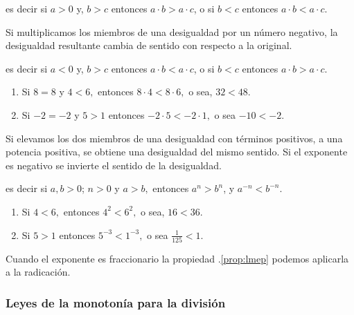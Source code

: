 \documentclass[oneside,english,spanish,2m,twoside,svgnames,x11names,HTML,twoside,12pt]{libro-matua}\usepackage[]{graphicx}\usepackage[]{color}
\def\myref#1{\textcolor{ptctitle}{\thesection .\ref{#1}}}
\begin{document}
es decir si $a>0$ y, $b>c$ entonces $a\cdot b>a\cdot c$, o si $b<c$
entonces $a\cdot b<a\cdot c$.

\begin{propiedad}{}

Si multiplicamos los miembros de una desigualdad por un número negativo,
la desigualdad resultante cambia de sentido con respecto a la original.

\end{propiedad}

es decir si $a<0$ y, $b>c$ entonces $a\cdot b<a\cdot c$, o si $b<c$
entonces $a\cdot b>a\cdot c$.\begin{ejemplos}
\begin{enumerate}
\item Si $8=8$ y $4<6,$ entonces $8\cdot4<8\cdot6,$ o sea, $32<48.$
\item Si $-2=-2$ y $5>1$ entonces $-2\cdot5<-2\cdot1,$ o sea $-10<-2$.
\end{enumerate}
\end{ejemplos}

\begin{propiedad}{\label{prop:lmep}}

Si elevamos los dos miembros de una desigualdad con términos positivos,
a una potencia positiva, se obtiene una desigualdad del mismo sentido.
Si el exponente es negativo se invierte el sentido de la desigualdad.

\end{propiedad}

es decir si $a,b>0$; $n>0$ y $a>b,$ entonces $a^{n}>b^{n}$, y
$a^{-n}<b^{-n}.$

\begin{ejemplos}
\begin{enumerate}
\item Si $4<6,$ entonces $4^{2}<6^{2},$ o sea, $16<36.$
\item Si $5>1$ entonces $5^{-3}<1^{-3},$ o sea $\frac{1}{125}<1$.
\end{enumerate}
\end{ejemplos}

\obs Cuando el exponente es fraccionario la propiedad \myref{prop:lmep}
podemos aplicarla a la radicación.

\subsubsection{Leyes de la monotonía para la división}

\vspace*{10pt}
\end{document}
